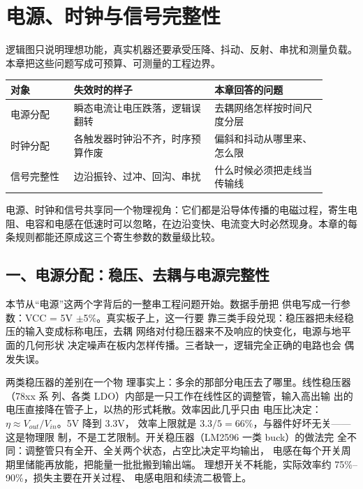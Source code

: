 \chapter{电源、时钟与信号完整性}

\begin{keyidea}
逻辑图只说明理想功能，真实机器还要承受压降、抖动、反射、串扰和测量负载。本章把这些问题写成可预算、可测量的工程边界。
\end{keyidea}

\begin{longtable}{L{0.18\linewidth}L{0.4\linewidth}L{0.32\linewidth}}
\toprule
对象 & 失效时的样子 & 本章回答的问题 \\
\midrule
电源分配 & 瞬态电流让电压跌落，逻辑误翻转 & 去耦网络怎样按时间尺度分层 \\\tablerowrule
时钟分配 & 各触发器时钟沿不齐，时序预算作废 & 偏斜和抖动从哪里来、怎么限 \\\tablerowrule
信号完整性 & 边沿振铃、过冲、回沟、串扰 & 什么时候必须把走线当传输线 \\
\bottomrule
\end{longtable}

\begin{keyidea}
电源、时钟和信号共享同一个物理视角：它们都是沿导体传播的电磁过程，寄生电阻、电容和电感在低速时可以忽略，在边沿变快、电流变大时必然现身。本章的每条规则都能还原成这三个寄生参数的数量级比较。
\end{keyidea}

\section{一、电源分配：稳压、去耦与电源完整性}

本节从“电源”这两个字背后的一整串工程问题开始。数据手册把
供电写成一行参数：VCC = 5V $\pm$5\%。真实板子上，这一行要
靠三类手段兑现：稳压器把未经稳压的输入变成标称电压，去耦
网络对付稳压器来不及响应的快变化，电源与地平面的几何形状
决定噪声在板内怎样传播。三者缺一，逻辑完全正确的电路也会
偶发失误。

两类稳压器的差别在一个物
理事实上：多余的那部分电压去了哪里。线性稳压器（78xx 系
列、各类 LDO）内部是一只工作在线性区的调整管，输入高出输
出的电压直接降在管子上，以热的形式耗散。效率因此几乎只由
电压比决定：$\eta \approx V_{out}/V_{in}$。5V 降到 3.3V，
效率上限就是 $3.3/5 = 66\%$，与器件好坏无关——这是物理限
制，不是工艺限制。开关稳压器（LM2596 一类 buck）的做法完
全不同：调整管只有全开、全关两个状态，占空比决定平均输出，
电感在每个开关周期里储能再放能，把能量一批批搬到输出端。
理想开关不耗能，实际效率约 75\%--90\%，损失主要在开关过程、
电感电阻和续流二极管上。

